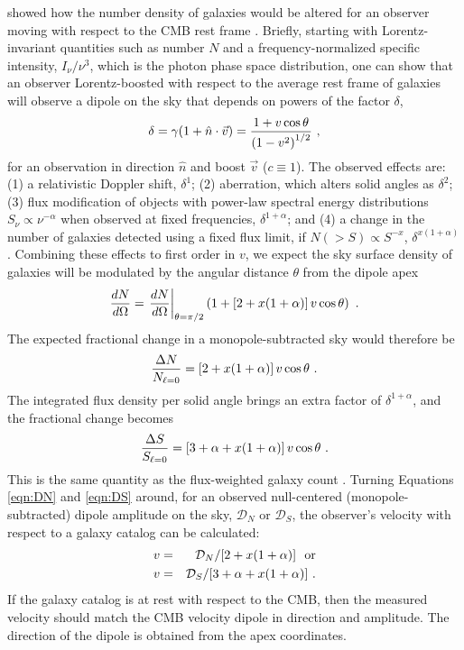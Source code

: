 \documentclass[twocolumn]{aastex63}
\begin{document}
\citet{ellis1984} showed how the number density of galaxies would be altered for an observer moving with
respect to the CMB rest frame \citep[see also][]{gibelyou2012,rubart2013}.
Briefly, starting with
Lorentz-invariant quantities such as number $N$ and a frequency-normalized specific intensity, $I_\nu/\nu^3$,
which is the photon phase space distribution, one can show that an observer Lorentz-boosted 
with respect to the average rest frame of galaxies will observe a dipole on the sky
that depends on powers of the factor $\delta$, 
\begin{equation}
  \delta = \gamma (1+\hat{n}\cdot\vec{v}) = {1+v \cos \theta \over \left(1-v^2\right)^{1/2}}\ ,
\end{equation}
for an observation in direction $\hat{n}$ and boost $\vec{v}$ ($c \equiv 1$).
The observed effects are:
(1) a relativistic Doppler shift, $\delta^1$; 
(2) aberration, which alters solid angles as $\delta^2$; 
(3) flux modification of objects with power-law spectral energy distributions $S_\nu \propto \nu^{-\alpha}$
when observed at fixed frequencies, $\delta^{1+\alpha}$; and 
(4) a change in the number of galaxies detected using a fixed flux limit, if $N(>S) \propto S^{-x}$, $\delta^{x(1+\alpha)}$.
Combining these effects to first order in $v$, we expect the
sky surface density of galaxies will be modulated by the angular distance $\theta$ from the dipole apex
\begin{equation}
  {dN \over d\Omega} = \left.{dN \over d\Omega}\right|_{\theta=\pi/2}\left(1+ [2+x (1+\alpha)]\, v \cos\theta\right)\ .
\end{equation}
The expected fractional change in a monopole-subtracted sky would therefore be
\begin{equation}\label{eqn:DN}
  {\Delta N \over N_{\ell=0}} = [2+x (1+\alpha)]\, v \cos\theta\ .
\end{equation}
The integrated flux density per solid angle brings an extra factor of $\delta^{1+\alpha}$, and the fractional change becomes
\begin{equation}\label{eqn:DS}
  {\Delta S \over S_{\ell=0}} = [3+\alpha+x (1+\alpha)]\, v \cos\theta\ .
\end{equation}
This is the same quantity as the flux-weighted galaxy count \citep{rubart2013}.
Turning Equations \ref{eqn:DN} and \ref{eqn:DS} around, for an observed null-centered (monopole-subtracted) dipole amplitude on the sky,
$\mathcal{D}_N$ or $\mathcal{D}_S$, the observer's velocity with respect to a galaxy catalog can be calculated:
\begin{eqnarray}
 v & = &  \mathcal{D}_N / [2+x (1+\alpha)]  \ \ {\rm or} \label{eqn:vN}\\
 v & = &  \mathcal{D}_S / [3+\alpha+x (1+\alpha)]\ . \label{eqn:vS}
\end{eqnarray}
If the galaxy catalog is at rest with respect to the CMB, then the measured velocity should match the CMB velocity
dipole in direction and amplitude.  The direction of the dipole is obtained from the apex coordinates.
\end{document}

